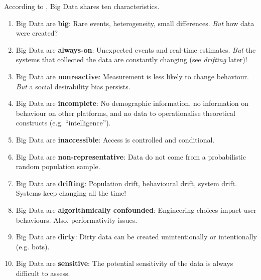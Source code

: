 \documentclass[serif, aspectratio=169]{beamer}
\begin{document}
\begin{frame}

According to \autocite{salganik_bit_2018}, Big Data shares ten characteristics. 

\begin{enumerate}

\item<1-> Big Data are \textbf{big}: Rare events, heterogeneity, small differences. \textit{But} how data were created?

\item<2-> Big Data are \textbf{always-on}: Unexpected events and real-time estimates. \textit{But} the systems that collected the data are constantly changing (see \textit{drifting} later)!

\item<3-> Big Data are \textbf{nonreactive}: Measurement is less likely to change behaviour. \textit{But} a social desirability bias persists. 

\item<4-> Big Data are \textbf{incomplete}: No demographic information, no information on behaviour on other platforms, and no data to operationalise theoretical constructs (e.g. \enquote{intelligence}).

\item<5-> Big Data are \textbf{inaccessible}: Access is controlled and conditional. 

\end{enumerate}

\end{frame}

\begin{frame} 

\begin{enumerate}

\setcounter{enumi}{5}

\item<1-> Big Data are \textbf{non-representative}: Data do not come from a probabilistic random population sample. 

\item<2-> Big Data are \textbf{drifting}: Population drift, behavioural drift, system drift. Systems keep changing all the time!

\item<3-> Big Data are \textbf{algorithmically confounded}: Engineering choices impact user behaviours. Also, performativity issues.

\item<4-> Big Data are \textbf{dirty}: Dirty data can be created unintentionally or intentionally (e.g. bots). 

 \item<5-> Big Data are \textbf{sensitive}: The potential sensitivity of the data is always difficult to assess. 

\end{enumerate}

\end{frame}
\end{document}
